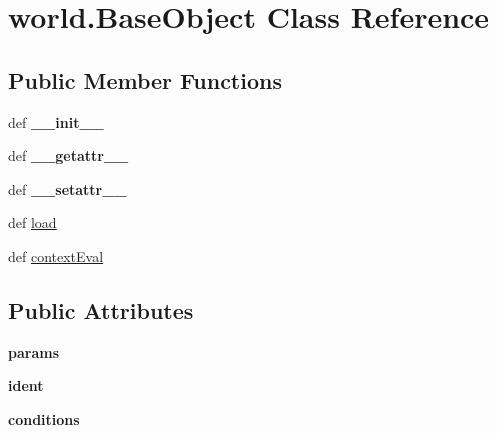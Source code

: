 \hypertarget{classworld_1_1_base_object}{\section{world.\-Base\-Object \-Class \-Reference}
\label{classworld_1_1_base_object}
}
\subsection*{\-Public \-Member \-Functions}
\begin{DoxyCompactItemize}
\item 
\hypertarget{classworld_1_1_base_object_a2e855c80dfc2c952edd876d1b10c9dfa}{def {\bfseries \-\_\-\-\_\-init\-\_\-\-\_\-}}\label{classworld_1_1_base_object_a2e855c80dfc2c952edd876d1b10c9dfa}

\item 
\hypertarget{classworld_1_1_base_object_acaebe544ee73eda0deecd24a4ee18a47}{def {\bfseries \-\_\-\-\_\-getattr\-\_\-\-\_\-}}\label{classworld_1_1_base_object_acaebe544ee73eda0deecd24a4ee18a47}

\item 
\hypertarget{classworld_1_1_base_object_a3d1982b8639ed550e69995389a120f0b}{def {\bfseries \-\_\-\-\_\-setattr\-\_\-\-\_\-}}\label{classworld_1_1_base_object_a3d1982b8639ed550e69995389a120f0b}

\item 
def \hyperlink{classworld_1_1_base_object_a933629183a0c136c1d455e733573498c}{load}
\item 
def \hyperlink{classworld_1_1_base_object_abd25e990a3bbf5bc3861e100dc83c027}{context\-Eval}
\end{DoxyCompactItemize}
\subsection*{\-Public \-Attributes}
\begin{DoxyCompactItemize}
\item 
\hypertarget{classworld_1_1_base_object_a2819ce8d01e8dde74dc1dd5927c89938}{{\bfseries params}}\label{classworld_1_1_base_object_a2819ce8d01e8dde74dc1dd5927c89938}

\item 
\hypertarget{classworld_1_1_base_object_a65875ade7c9541730d1a1e7a702d5ce6}{{\bfseries ident}}\label{classworld_1_1_base_object_a65875ade7c9541730d1a1e7a702d5ce6}

\item 
\hypertarget{classworld_1_1_base_object_ae6efb4dbfeb0cc66db81f55dda20d3dc}{{\bfseries conditions}}\label{classworld_1_1_base_object_ae6efb4dbfeb0cc66db81f55dda20d3dc}

\end{DoxyCompactItemize}

